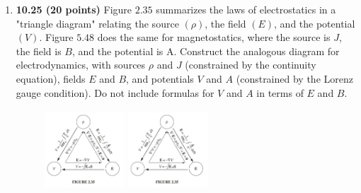 \documentclass[fleqn]{article}
\begin{document}
\begin{enumerate}
    \pagebreak

    \item \textbf{10.25 (20 points)} Figure $2.35$ summarizes the laws of electrostatics in a "triangle
    diagram" relating the source $(\rho)$, the field $(E)$, and the potential $(V)$. Figure $5.48$
    does the same for magnetostatics, where the source is $J$, the field is $B$, and the
    potential is A. Construct the analogous diagram for electrodynamics, with sources
    $\rho$ and $J$ (constrained by the continuity equation), fields $E$ and $B$, and potentials $V$
    and $A$ (constrained by the Lorenz gauge condition). Do not include formulas for $V$
    and $A$ in terms of $E$ and $B$.

    \begin{figure}[htp]
        \includegraphics[height=3cm, width=3cm]{2.JPG}
        \includegraphics[height=3cm, width=3cm]{2.JPG}
    \end{figure}

    
  \end{enumerate}
\end{document}

